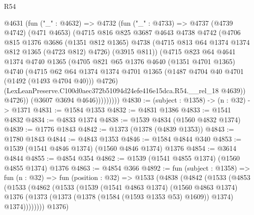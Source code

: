 \begin{lexlean}{R54}
\begin{coremodule}
              @4631
                (fun ("_" : @4632) =>
                @4732
                  (fun ("_" : @4733) =>
                  @4737
                    (@4739 @4742)
                    (@471 @4653)
                    (@4715
                      @816
                      @825
                      @3687
                      @4643
                      @4738
                      @4742
                      (@4706
                        @815
                        @1376
                        @3686
                        (@1351 @812 @1365)
                        @4738
                        (@4715 @813 @64 @1374 @1374 @812 @1365 (@4723 @812) @4726)
                        (@3915 @811))
                      (@4715
                        @823
                        @64
                        @4641
                        @1374
                        @4740
                        @1365
                        (@4705
                          @821
                          @65
                          @1376
                          @4640
                          (@1351 @4701 @1365)
                          @4740
                          (@4715
                            @62
                            @64
                            @1374
                            @1374
                            @4701
                            @1365
                            (@1487 @4704 @40 @4701 (@1492 (@1493 @4704 @40)))
                            @4726)
                          (LexLeanPreserve.C100d0aec372b51094d24efe416e15dca.R54.__rel_18 @4639))
                        @4726))
                    (@3607 @3694 @4646)))))))))
@4830 := (subject : @1358) -> (n : @32) -> @1371
@4831 := @1584 @1353
@4832 := @4831 @1386
@4833 := @1541 @4832
@4834 := @4833 @1374
@4838 := @1539 @4834 (@1560 @4832 @1374)
@4839 := @1776 @1843
@4842 := @1373 (@1378 (@4839 @1353))
@4843 := @1780 @1843
@4844 := @4843 @1353
@4846 := @1584 @4844 @340
@4853 := @1539 (@1541 @4846 @1374) (@1560 @4846 @1374) @1376
@4854 := @3614 @4844
@4855 := @4854 @354
@4862 := @1539 (@1541 @4855 @1374) (@1560 @4855 @1374) @1376
@4863 := @4854 @366
@4892 := fun (subject : @1358) =>
  fun (n : @32) =>
  fun (position : @32) =>
  @1533
    (@4838
      (@4842
        (@1533
          (@4853
            (@1533
              (@4862
                (@1533
                  (@1539
                    (@1541 @4863 @1374)
                    (@1560 @4863 @1374)
                    @1376
                    (@1373 (@1373 (@1378 (@1584 (@1593 @1353 @53) @1609)) @1374) @1374))))))))
      @1376)

\end{coremodule}
\end{lexlean}
